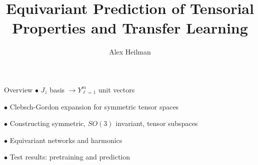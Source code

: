 \documentclass[11pt]{beamer}
\title{Equivariant Prediction of Tensorial Properties and Transfer Learning}
\author{Alex Heilman}
\begin{document}
\begin{frame}
\titlepage
\end{frame}


\begin{frame}{Overview}
$\bullet$ $J_z$ basis $\rightarrow Y_{\ell = 1}^m$ unit vectors

\medskip

$\bullet$  Clebsch-Gordon expansion for symmetric tensor spaces

\medskip

$\bullet$  Constructing symmetric, $SO(3)$ invariant, tensor subspaces

\medskip

$\bullet$  Equivariant networks and harmonics

\medskip

$\bullet$  Test results: pretraining and prediction
\end{frame}
\end{document}
